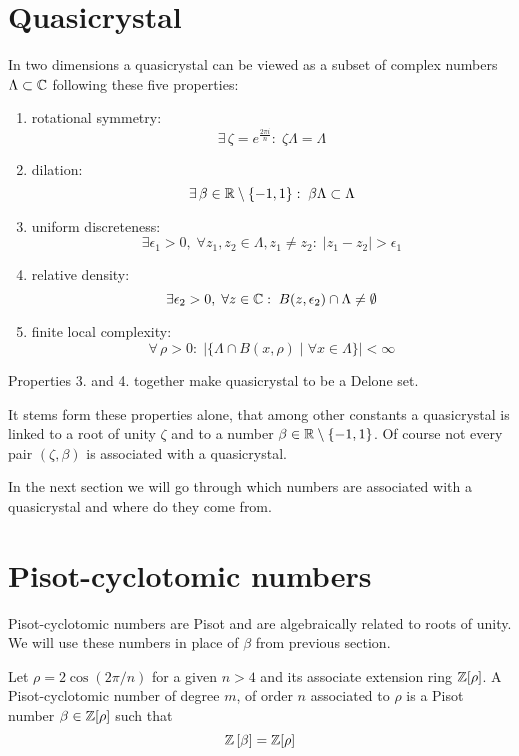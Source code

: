 \documentclass[text.tex]{subfiles}
\begin{document}
\section{Quasicrystal}
In two dimensions a quasicrystal can be viewed as a subset of complex numbers $\Lambda\subset\mathbb{C}$ following these five properties:

\begin{enumerate}
\item rotational symmetry: $$\exists\,\zeta = e^{\frac{2\pi i}{n}}:\; \zeta\Lambda = \Lambda$$
\item dilation: $$\exists\,\beta\in\mathbb{R}\setminus\{-1,1\}:\; \beta\Lambda\subset \Lambda$$
\item uniform discreteness: $$\exists \epsilon_1>0,\; \forall z_1,z_2\in\Lambda, z_1\neq z_2:\; |z_1-z_2|>\epsilon_1$$
\item relative density: $$\exists \epsilon_2>0,\; \forall z\in\mathbb{C}:\; B(z,\epsilon_2)\cap\Lambda \neq \emptyset$$
\item finite local complexity: $$\forall\,\rho>0:\;\big|\{\Lambda\cap B(x,\rho)\;|\;\forall x\in\Lambda\}\big| < \infty$$
\end{enumerate}

\begin{remark}
Properties 3. and 4. together make quasicrystal to be a Delone set.
\end{remark}

It stems form these properties alone, that among other constants a quasicrystal is linked to a root of unity $\zeta$ and to a number $\beta\in\mathbb{R}\setminus\{-1,1\}$. Of course not every pair $(\zeta, \beta)$ is associated with a quasicrystal.

In the next section we will go through which numbers are associated with a quasicrystal and where do they come from. 

\section{Pisot-cyclotomic numbers}
Pisot-cyclotomic numbers are Pisot and are algebraically related to roots of unity. We will use these numbers in place of $\beta$ from previous section. 

\begin{definition}
Let $\rho = 2\cos\left(2\pi/n\right)$ for a given $n>4$ and its associate extension ring $\mathbb{Z}[\rho]$. A Pisot-cyclotomic number of degree $m$, of order $n$ associated to $\rho$ is a Pisot number $\beta \in \mathbb{Z}[\rho]$ such that
$$\mathbb{Z}\left[\beta\right] = \mathbb{Z}[\rho]$$
\end{definition}
\end{document}
